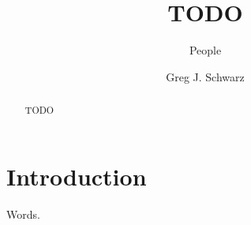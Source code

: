\documentclass[modern]{aastex631}
\begin{document}
\title{TODO}

\author{People}
\author[0000-0002-0786-7307]{Greg J. Schwarz}

\begin{abstract}

TODO

\end{abstract}

\section{Introduction} \label{sec:intro}

Words.

{}

\end{document}
